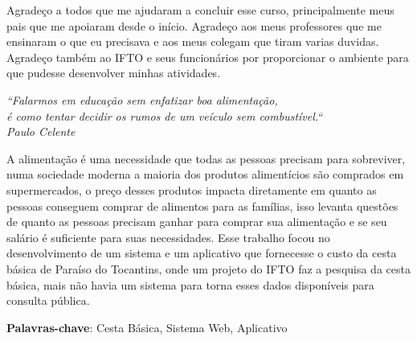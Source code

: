 \documentclass{ifto-tex}
\begin{document}
\begin{agradecimentos}
Agradeço a todos que me ajudaram a concluir esse curso, principalmente meus pais que me apoiaram desde o início. Agradeço aos meus professores que me ensinaram o que eu precisava e aos meus colegam que tiram varias duvidas. Agradeço também ao IFTO e seus funcionários por proporcionar o ambiente para que pudesse desenvolver minhas atividades.
\end{agradecimentos}


\begin{epigrafe}
	\vspace*{\fill}
	\begin{flushright}
		\textit{
			``Falarmos em educação sem enfatizar boa alimentação,\\ é como tentar decidir os rumos de um veículo sem combustível.``\\
			Paulo Celente
		}
	\end{flushright}
\end{epigrafe}


\setlength{\absparsep}{18pt} %

\begin{resumo}
A alimentação é uma necessidade que todas as pessoas precisam para sobreviver, numa sociedade moderna a maioria dos produtos alimentícios são comprados em supermercados, o preço desses produtos impacta diretamente em quanto as pessoas conseguem comprar de alimentos para as famílias, isso levanta questões de quanto as pessoas precisam ganhar para comprar sua alimentação e se seu salário é suficiente para suas necessidades. Esse trabalho focou no desenvolvimento de um sistema e um aplicativo que fornecesse o custo da cesta básica de Paraíso do Tocantins, onde um projeto do IFTO faz a pesquisa da cesta básica, mais não havia um sistema para torna esses dados disponíveis para consulta pública.
	
	\textbf{Palavras-chave}: Cesta Básica, Sistema Web, Aplicativo
\end{resumo}
\end{document}
